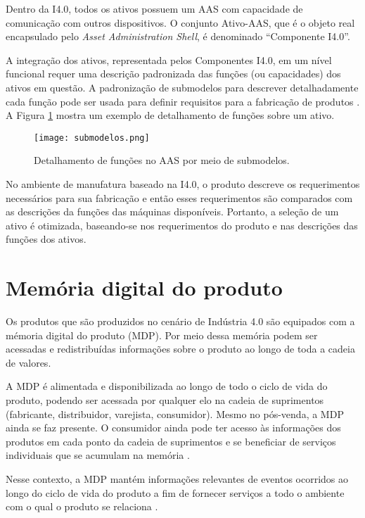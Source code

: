 	Dentro da I4.0, todos os ativos possuem um AAS com capacidade de comunicação com outros dispositivos. O conjunto Ativo-AAS, que é o objeto real encapsulado pelo \textit{Asset Administration Shell}, é denominado ``Componente I4.0''.
	
	A integração dos ativos, representada pelos Componentes I4.0, em um nível funcional requer uma descrição padronizada das funções (ou capacidades) dos ativos em questão. A padronização de submodelos para descrever detalhadamente cada função pode ser usada para definir requisitos para a fabricação de produtos \cite{bedenbender2017aasexamples}. A Figura \ref{fig:submodelos} mostra um exemplo de detalhamento de funções sobre um ativo.
	
	\begin{figure}[hbt!]
		\centering
		\caption{Detalhamento de funções no AAS por meio de submodelos.}
		\texttt{[image: submodelos.png]}
		\label{fig:submodelos}
	\end{figure}

	No ambiente de manufatura baseado na I4.0, o produto descreve os requerimentos necessários para sua fabricação e então esses requerimentos são comparados com as descrições da funções das máquinas disponíveis. Portanto, a seleção de um ativo é otimizada, baseando-se nos requerimentos do produto e nas descrições das funções dos ativos.
	

\section{Memória digital do produto}

	Os produtos que são produzidos no cenário de Indústria 4.0 são equipados com a mémoria digital do produto (MDP). Por meio dessa memória podem ser acessadas e redistribuídas informações sobre o produto ao longo de toda a cadeia de valores.

	A MDP é alimentada e disponibilizada ao longo de todo o ciclo de vida do produto, podendo ser acessada por qualquer elo na cadeia de suprimentos (fabricante, distribuidor, varejista, consumidor). Mesmo no pós-venda, a MDP ainda se faz presente. O consumidor ainda pode ter acesso às informações dos produtos em cada ponto da cadeia de suprimentos e se beneficiar de serviços individuais que se acumulam na memória \cite{brandherm2011productmemory}.

	Nesse contexto, a MDP mantém informações relevantes de eventos ocorridos ao longo do ciclo de vida do produto a fim de fornecer serviços a todo o ambiente com o qual o produto se relaciona \cite{brandherm2011productmemory}.
	
